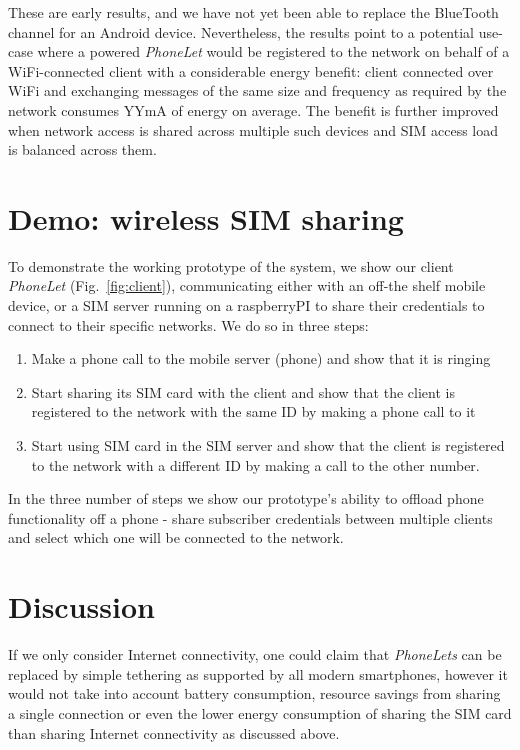 \documentclass{sig-alternate-10pt}
\begin{document}
These are early results, and we have not yet been able to replace the BlueTooth channel for an Android device. Nevertheless, the results point to a potential use-case where a powered \emph{PhoneLet} would be registered to the network on behalf of a WiFi-connected client with a considerable energy benefit: client connected over WiFi and exchanging messages of the same size and frequency as required by the network consumes YYmA of energy on average. The benefit is further improved when network access is shared across multiple such devices and SIM access load is balanced across them.

\section{Demo: wireless SIM sharing}

To demonstrate the working prototype of the system, we show our client \emph{PhoneLet} (Fig.~\ref{fig:client}), communicating either with an off-the shelf mobile device, or a SIM server running on a raspberryPI to share their
credentials to connect to their specific networks. We do so in three steps:

\begin{enumerate}
    \item Make a phone call to the mobile server (phone) and show that it is ringing
    \item Start sharing its SIM card with the client and show that the client is registered to the network with the same ID by making a phone call to it
    \item Start using SIM card in the SIM server and show that the client is registered to the network with a different ID by making a call to the other number.
\end{enumerate}

In the three number of steps we show our prototype's ability to offload phone functionality off a phone - share subscriber credentials between multiple clients and select which one will be connected to the network.

\section{Discussion}

If we only consider Internet connectivity, one could claim that \emph{PhoneLets} can be replaced by simple tethering as supported by all modern smartphones, however it would not take into account battery consumption, resource savings from sharing a single connection or even the lower energy consumption of sharing the SIM card than sharing Internet connectivity as discussed above.
\end{document}
